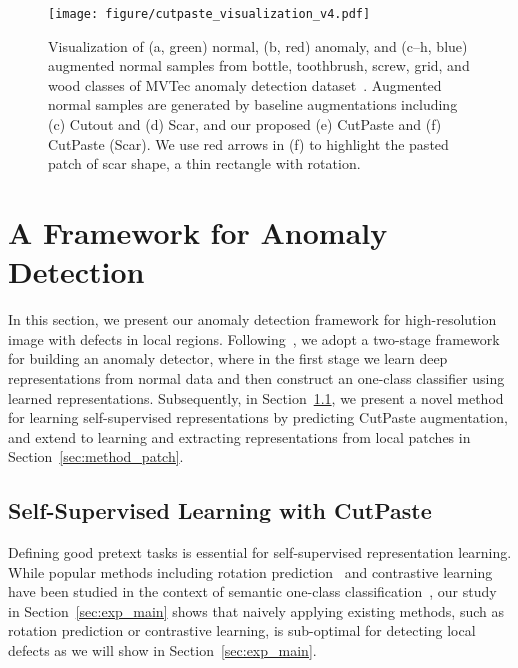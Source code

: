 \documentclass[final]{cvpr}
\begin{document}
\begin{figure*}[t]
    \centering
    \texttt{[image: figure/cutpaste\_visualization\_v4.pdf]}
    \vspace{-0.1in}
    \caption{Visualization of (a, green) normal, (b, red) anomaly, and (c--h, blue) augmented normal samples from bottle, toothbrush, screw, grid, and wood classes of MVTec anomaly detection dataset~\cite{bergmann2019mvtec}. Augmented normal samples are generated by baseline augmentations including (c) Cutout and (d) Scar, and our proposed (e) CutPaste and (f) CutPaste (Scar). We use red arrows in (f) to highlight the pasted patch of scar shape, a thin rectangle with rotation.}
    \label{fig:mvtec_defect_visualize}
    \vspace{-0.15in}
\end{figure*}


\section{A Framework for Anomaly Detection}
\label{sec:method}
In this section, we present our anomaly detection framework for high-resolution image with  defects in local regions. Following~\cite{tack2020csi}, we adopt a two-stage framework for building an anomaly detector, where in the first stage we learn deep representations from normal data and then construct an one-class classifier using learned representations.
Subsequently, in Section~\ref{sec:method_cutpaste}, we present a novel method for learning self-supervised representations by predicting CutPaste augmentation, and extend to learning and extracting representations from local patches in Section~\ref{sec:method_patch}.





\subsection{Self-Supervised Learning with CutPaste}
\label{sec:method_cutpaste}
Defining good pretext tasks is essential for self-supervised representation learning.
While popular methods including rotation prediction~\cite{gidaris2018unsupervised} and contrastive learning~\cite{ye2019unsupervised,chen2020simple} have been studied in the context of semantic one-class classification~\cite{golan2018deep,hendrycks2019using,bergman2020classification,tack2020csi,sohn2020learning}, our study in Section~\ref{sec:exp_main} shows that naively applying existing methods, such as rotation prediction or contrastive learning, is sub-optimal for detecting local defects as we will show in Section~\ref{sec:exp_main}.
\end{document}
